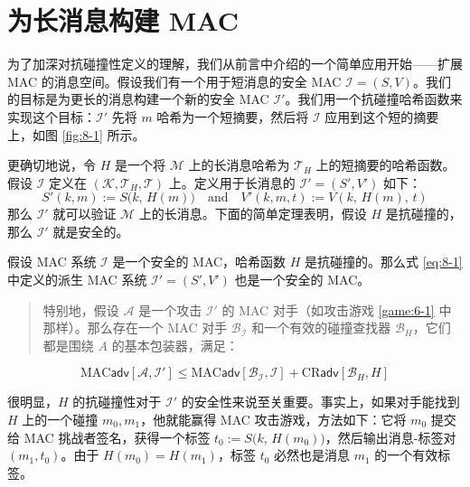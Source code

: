 \section{为长消息构建 MAC}\label{sec:8-2}

为了加深对抗碰撞性定义的理解，我们从前言中介绍的一个简单应用开始——扩展 MAC 的消息空间。假设我们有一个用于短消息的安全 MAC $\mathcal{I}=(S,V)$。我们的目标是为更长的消息构建一个新的安全 MAC $\mathcal{I}'$。我们用一个抗碰撞哈希函数来实现这个目标：$\mathcal{I}'$ 先将 $m$ 哈希为一个短摘要，然后将 $\mathcal{I}$ 应用到这个短的摘要上，如图 \ref{fig:8-1} 所示。

更确切地说，令 $H$ 是一个将 $\mathcal{M}$ 上的长消息哈希为 $\mathcal{T}_H$ 上的短摘要的哈希函数。假设 $\mathcal{I}$ 定义在 $(\mathcal{K},\mathcal{T}_H,\mathcal{T})$ 上。定义用于长消息的 $\mathcal{I}'=(S',V')$ 如下：
\begin{equation}\label{eq:8-1}
S'(k,m):=S\big(k,\,H(m)\big)
\quad\text{and}\quad
V'(k,m,t):=V(k,\,H(m),\,t)
\end{equation}
那么 $\mathcal{I}'$ 就可以验证 $\mathcal{M}$ 上的长消息。下面的简单定理表明，假设 $H$ 是抗碰撞的，那么 $\mathcal{I}'$ 就是安全的。

\begin{theorem}\label{theo:8-1}
假设 MAC 系统 $\mathcal{I}$ 是一个安全的 MAC，哈希函数 $H$ 是抗碰撞的。那么式 \ref{eq:8-1} 中定义的派生 MAC 系统 $\mathcal{I}'=(S',V')$ 也是一个安全的 MAC。
\begin{quote}
特别地，假设 $\mathcal{A}$ 是一个攻击 $\mathcal{I}'$ 的 MAC 对手（如攻击游戏 \ref{game:6-1} 中那样）。那么存在一个 MAC 对手 $\mathcal{B}_\mathcal{I}$ 和一个有效的碰撞查找器 $\mathcal{B}_H$，它们都是围绕 $A$ 的基本包装器，满足：
\end{quote}
\[
\mathrm{MAC}\mathsf{adv}[\mathcal{A},\mathcal{I}']\leq
\mathrm{MAC}\mathsf{adv}[\mathcal{B}_\mathcal{I},\mathcal{I}]+
\mathrm{CR}\mathsf{adv}[\mathcal{B}_H,H]
\]
\end{theorem}

很明显，$H$ 的抗碰撞性对于 $\mathcal{I}'$ 的安全性来说至关重要。事实上，如果对手能找到 $H$ 上的一个碰撞 $m_0,m_1$，他就能赢得 MAC 攻击游戏，方法如下：它将 $m_0$ 提交给 MAC 挑战者签名，获得一个标签 $t_0:=S\big(k,\,H(m_0)\big)$，然后输出消息-标签对 $(m_1,t_0)$。由于 $H(m_0)=H(m_1)$，标签 $t_0$ 必然也是消息 $m_1$ 的一个有效标签。


